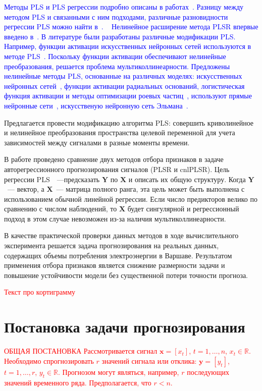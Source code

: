 \documentclass[12pt,twoside]{article}
\newcommand{\bY}{\mathbf{Y}}
\newcommand{\bX}{\mathbf{X}}
\begin{document}
\textcolor{blue}{Методы PLS и PLS регрессии подробно описаны в работах~\cite{Geladi1988, Hoskuldsson1988}. 
Разницу между методом PLS и связанными с ним подходами, различные разновидности регрессии PLS можно найти в~\cite{Lehky2014}.}
 
\textcolor{blue}{Нелинейное расширение метода PLSR впервые введено в~\cite{Frank1990}. В литературе были разработаны различные модификации PLS. Например, функции активации искусственных нейронных сетей используются в методе PLS~\cite{Malthouse1997}. Поскольку функции активации обеспечивают нелинейные преобразования, решается проблема мультиколлинеарности. Предложены нелинейные методы PLS, основанные на различных моделях:  искусственных нейронных сетей~\cite{Mcavovt1992}, функции активации радиальных оснований\cite{Yan2003}, логистическая функция активации и методы оптимизации роевых частиц~\cite{Zhou2007}, используют прямые нейронные сети~\cite{Xuefeng2010}, искусственую нейронную сеть Эльмана~\cite{Bulut2014}.}

Предлагается провести модификацию алгоритма PLS: совершить криволинейное и нелинейное преобразования пространства целевой переменной для учета зависимостей между сигналами в разные моменты времени.


В работе проведено сравнение двух методов отбора признаков в задаче авторегрессионного прогнозирования сигналов (PLSR и cnlPLSR). 
Цель регрессии PLS~\cite{Abdi2003}~---предсказать $\bY$ по $\bX$ и описать их общую структуру. Когда $\bY$~--- вектор, а $\bX$~--- матрица полного ранга, эта цель может быть выполнена с использованием обычной линейной регрессии. Если число предикторов велико по сравнению с числом наблюдений, то $\bX$ будет сингулярной и регрессионный подход в этом случае невозможен из-за наличия мультиколлинеарности.

В качестве практической проверки данных методов в ходе вычислительного эксперимента решается задача прогнозирования на реальных данных, содержащих объемы потребления электроэнергии в Варшаве.
Результатом применения отбора признаков является снижение размерности задачи и повышение устойчивости модели без существенной потери точности прогноза.

\textcolor{red}{ Текст про кортиграмму}
 
\newpage
\section{Постановка задачи прогнозирования}
\textcolor{red}{ ОБЩАЯ ПОСТАНОВКА
Рассмотривается сигнал $\mathbf{x} = [x_t]$,  $t = 1, \dots , n$, $x_t \in \mathbb{R}$. Необходимо спрогнозировать $r$ значений сигнала или отклика:  
$\mathbf{y} = [y_t]$,  $t = 1, \dots , r$, $y_t \in \mathbb{R}$. Прогнозом могут являться, например, $r$ последующих значений временного ряда. 
Предполагается, что $r < n$. }
\end{document}
